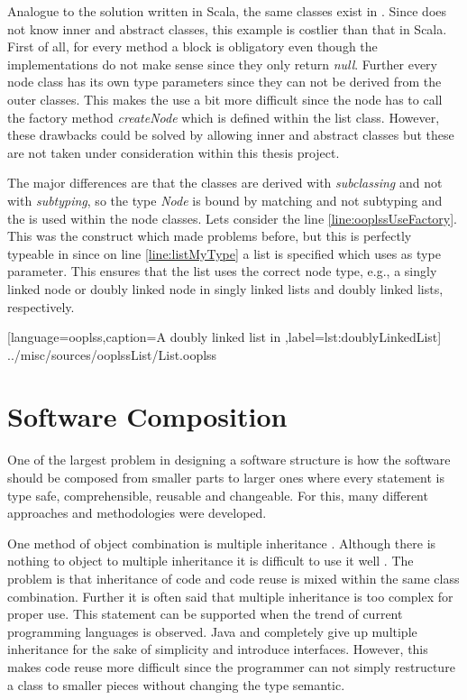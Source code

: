 Analogue to the solution written in Scala, the same classes exist
in \ooplss. Since \ooplss does not know inner and abstract classes,
this example is costlier than that in Scala. First of all, for every method
a block is obligatory even though the implementations do not make sense since
they only return \emph{null}. Further every node class has its own type
parameters since they can not be derived from the outer classes. This
makes the use a bit more difficult since the node has to call the factory
method \emph{createNode} which is defined within the list class. However,
these drawbacks could be solved by allowing inner and abstract classes but
these are not taken under consideration within this thesis project.

The major differences are that the classes are derived with
\emph{subclassing} and not with \emph{subtyping}, so the type
\emph{Node} is bound by matching and not subtyping and the
\mytype is used within the node classes. Lets consider the line
\ref{line:ooplssUseFactory}. This was the construct which made problems
before, but this is perfectly typeable in \ooplss since on
line \ref{line:listMyType} a list is specified which uses \mytype as
type parameter. This ensures that the list uses the correct node type,
e.g., a singly linked node or doubly linked node in singly
linked lists and doubly linked lists, respectively.


[language=ooplss,caption=A doubly linked list in \ooplss,label=lst:doublyLinkedList]
{../misc/sources/ooplssList/List.ooplss}

\section{Software Composition}
One of the largest problem in designing a software structure is how the
software should be composed from smaller parts to larger ones where every
statement is type safe, comprehensible, reusable and changeable. For this,
many different approaches and methodologies were developed.

One method of object combination is multiple inheritance
\cite{taivalsaari_notion_1996}. Although there is nothing
to object to multiple inheritance it is difficult to use it well
\cite{wegner_panel_1987}. The problem is that inheritance of code
and code reuse is mixed within the same class combination. Further
it is often said that multiple inheritance is too complex for proper use.
This statement can be supported when the trend of current programming languages 
is observed. Java and \cs completely give up multiple inheritance for
the sake of simplicity and introduce interfaces. However, this makes
code reuse more difficult since the programmer can not simply restructure
a class to smaller pieces without changing the type semantic.

